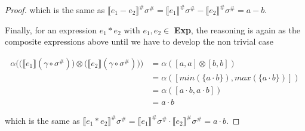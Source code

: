 \documentclass{article}
\begin{document}
\begin{proof}
  which is the same as 
  $\llbracket e_1 - e_2 \rrbracket^\# \sigma^\# = 
  \llbracket e_1 \rrbracket^\# \sigma^\# 
  - \llbracket e_2 \rrbracket^\# \sigma^\# 
  = a - b$.

  Finally, for an expression $e_1 * e_2$ with $e_1, e_2
  \in$ \textbf{Exp}, the reasoning is again as the composite 
  expressions above until we 
  have to develop the non trivial case

  \begin{align*}
    \alpha \Bigg(
      \Big(\llbracket e_1\rrbracket(\gamma \circ \sigma^\#)\Big) 
      \otimes
      \Big(\llbracket e_2\rrbracket(\gamma \circ \sigma^\#)\Big)
    \Bigg) &= \alpha([a,a] \otimes [b, b]) \\
      &= \alpha([min(\{a \cdot b\}),max(\{a \cdot b\})]) \\
      &= \alpha([a \cdot b,a \cdot b]) \\
      &= a \cdot b
  \end{align*}

  which is the same as 
  $\llbracket e_1 * e_2 \rrbracket^\# \sigma^\# = 
  \llbracket e_1 \rrbracket^\# \sigma^\# 
  \cdot \llbracket e_2 \rrbracket^\# \sigma^\# 
  = a \cdot b$.
\end{proof}
\end{document}

